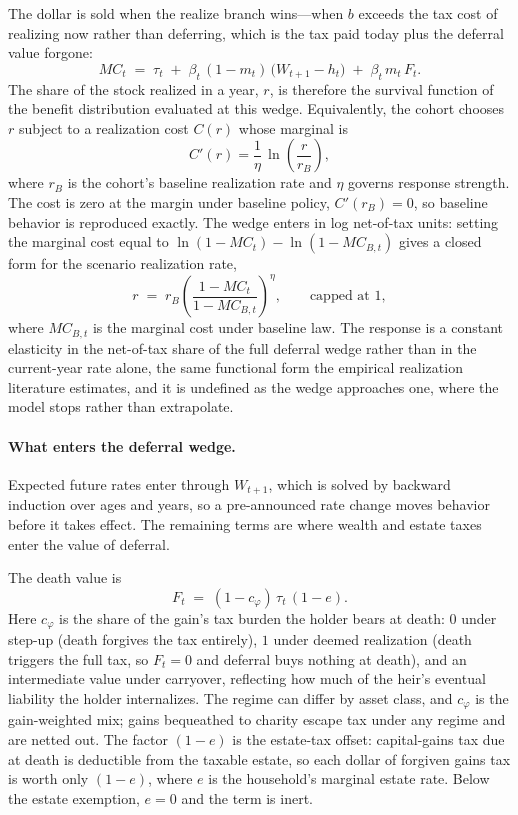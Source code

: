 \documentclass[10pt,twocolumn]{article}
\begin{document}
The dollar is sold when the realize branch wins---when $b$ exceeds the tax
cost of realizing now rather than deferring, which is the tax paid today plus
the deferral value forgone:
\begin{equation*}
MC_t \;=\; \tau_t \;+\; \beta_t\,(1-m_t)\,\big(W_{t+1} - h_t\big) \;+\; \beta_t\, m_t\, F_t.
\end{equation*}
The share of the stock realized in a year, $r$, is therefore the survival
function of the benefit distribution evaluated at this wedge. Equivalently,
the cohort chooses $r$ subject to a realization cost $C(r)$ whose marginal is
\begin{equation*}
C'(r) = \frac{1}{\eta}\,\ln\!\left(\frac{r}{r_B}\right),
\end{equation*}
where $r_B$ is the cohort's baseline realization rate and $\eta$ governs
response strength. The cost is zero at the margin under baseline policy,
$C'(r_B) = 0$, so baseline behavior is reproduced exactly. The wedge enters
in log net-of-tax units: setting the marginal cost equal to
$\ln(1 - MC_t) - \ln(1 - MC_{B,t})$ gives a closed form for the scenario
realization rate,
\begin{equation*}
r \;=\; r_B \left(\frac{1 - MC_t}{1 - MC_{B,t}}\right)^{\!\eta}, \qquad \text{capped at } 1,
\end{equation*}
where $MC_{B,t}$ is the marginal cost under baseline law. The response is a
constant elasticity in the net-of-tax share of the full deferral wedge rather
than in the current-year rate alone, the same functional form the empirical
realization literature estimates, and it is undefined as the wedge approaches
one, where the model stops rather than extrapolate.

\paragraph{What enters the deferral wedge.}
Expected future rates enter through $W_{t+1}$, which is solved by
backward induction over ages and years, so a pre-announced rate change moves
behavior before it takes effect. The remaining terms are where wealth and estate taxes enter the value of
deferral.

The death value is
\begin{equation*}
F_t \;=\; (1 - c_\varphi)\,\tau_t\,(1 - e).
\end{equation*}
Here $c_\varphi$ is the share of the gain's tax burden the holder bears at
death: $0$ under step-up (death forgives the tax entirely), $1$ under deemed
realization (death triggers the full tax, so $F_t = 0$ and deferral buys nothing
at death), and an intermediate value under carryover, reflecting how much of
the heir's eventual liability the holder internalizes. The regime can differ
by asset class, and $c_\varphi$ is the gain-weighted mix; gains bequeathed to
charity escape tax under any regime and are netted out. The factor $(1 - e)$
is the estate-tax offset: capital-gains tax due at death is deductible from
the taxable estate, so each dollar of forgiven gains tax is worth only
$(1 - e)$, where $e$ is the household's marginal estate rate. Below the estate
exemption, $e = 0$ and the term is inert.
\end{document}
